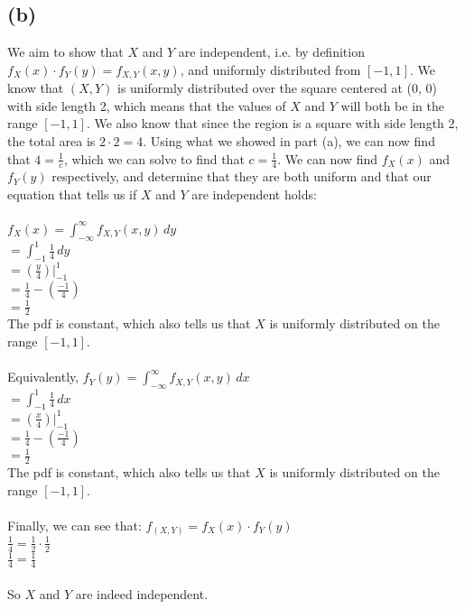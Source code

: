 \documentclass{article}
\begin{document}
{\subsection*{(b)}
We aim to show that $X$ and $Y$ are independent, i.e. by definition $f_X(x) \cdot f_Y(y) = f_{X, Y} (x,y)$, and uniformly distributed from $[-1, 1]$. We know that $(X, Y)$ is uniformly distributed over the square centered at (0, 0) with side length 2, which means that the values of $X$ and $Y$ will both be in the range $[-1, 1]$. We also know that since the region is a square with side length 2, the total area is $2 \cdot 2 = 4$. Using what we showed in part (a), we can now find that $4 = \frac{1}{c}$, which we can solve to find that $c = \frac{1}{4}$. We can now find $f_X(x)$ and $f_Y(y)$ respectively, and determine that they are both uniform and that our equation that tells us if $X$ and $Y$ are independent holds: \\ \\
$f_X(x) = \int_{-\infty}^{\infty} f_{X, Y} (x, y) \,dy$ \\ 
$= \int_{-1}^{1} \frac{1}{4} \,dy$ \\ 
$= (\frac{y}{4}) |_{-1}^{1}$ \\
$= \frac{1}{4} - (\frac{-1}{4})$ \\
$= \frac{1}{2}$ \\
The pdf is constant, which also tells us that $X$ is uniformly distributed on the range $[-1, 1]$. \\ \\
Equivalently, $f_Y(y) = \int_{-\infty}^{\infty} f_{X, Y} (x, y) \,dx$ \\ 
$= \int_{-1}^{1} \frac{1}{4} \,dx$ \\ 
$= (\frac{x}{4}) |_{-1}^{1}$ \\
$= \frac{1}{4} - (\frac{-1}{4})$ \\
$= \frac{1}{2}$ \\
The pdf is constant, which also tells us that $X$ is uniformly distributed on the range $[-1, 1]$. \\ \\
Finally, we can see that:
$f_(X, Y) = f_X(x) \cdot f_Y(y)$ \\
$\frac{1}{4} = \frac{1}{2} \cdot \frac{1}{2}$ \\ 
$\frac{1}{4} = \frac{1}{4}$
\\ \\
So $X$ and $Y$ are indeed independent.

}
\end{document}
